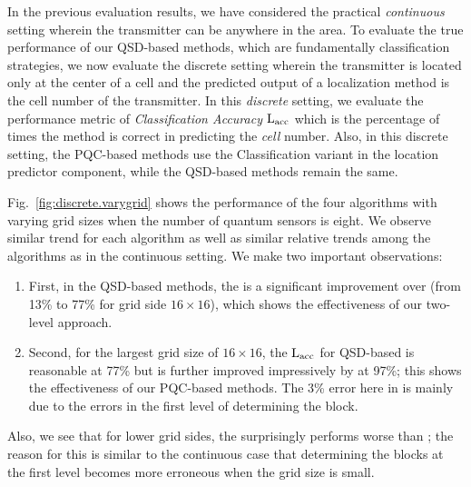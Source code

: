
In the previous evaluation results, we have considered the practical {\em continuous} setting wherein the transmitter can be anywhere in the area.
To evaluate the true performance of our QSD-based methods, which are fundamentally classification strategies, we now evaluate the discrete setting
wherein the transmitter is located only at the center of a cell and the 
predicted output of a localization method is the cell number of the transmitter.
In this {\em discrete} setting, we evaluate the performance metric of {\em Classification Accuracy} $\mathrm{L_{acc}}$ which is the percentage of times the method is correct in predicting the {\em cell} number. 
Also, in this discrete setting, the PQC-based methods use the Classification variant in the location predictor component, while the QSD-based methods remain the same.

Fig.~\ref{fig:discrete.varygrid} shows the performance of the four algorithms with varying grid sizes when the number of quantum sensors is eight. We observe similar trend for each algorithm as well as similar relative trends among the
algorithms as in the continuous setting. 
We make two important observations: 
\begin{enumerate}
    \item First, in the QSD-based methods, the \povm is a significant improvement over \povmone (from 13\% to 77\% for grid side $16\times16$), which shows the effectiveness of our two-level approach.
    \item Second, for the largest grid size of $16\times16$, the $\mathrm{L_{acc}}$ for QSD-based \povm is reasonable at 77\% but is further 
improved impressively by \pqctwo at 97\%; this shows the effectiveness of our PQC-based methods. The 3\% error here in \pqctwo is mainly due to the errors in the first level of determining the block.
\end{enumerate}
Also, we see that for lower grid sides, the \povm surprisingly performs worse than \povmone; the 
reason for this is similar to the continuous case that determining the blocks at the first level becomes more erroneous when the grid size is small.


